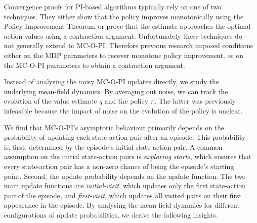 
Convergence proofs for PI-based algorithms 
typically rely on one of two techniques.
They either show that the policy improves monotonically using the Policy Improvement Theorem,
or prove that the estimate approaches the optimal action values using a contraction argument.
Unfortunately these techniques do not generally extend to MC-O-PI.
Therefore previous research imposed conditions either on
the MDP parameters to recover monotone policy improvement,
or
on the MC-O-PI parameters to obtain a contraction argument.


Instead of analysing the noisy MC-O-PI updates directly,
we study the underlying mean-field dynamics.
By averaging out noise, we can track the evolution of the value estimate $q$ and the policy $\pi$. The latter was previously infeasible because the impact of noise on the evolution of the policy is unclear.


We find that MC-O-PI's asymptotic behaviour primarily depends on the probability of updating each state-action pair after an episode.
This probability is, first, determined by the episode's initial state-action pair.
% 
A common assumption on the initial state-action pairs is \textit{exploring starts}, which ensures that every state-action pair has a non-zero chance of being the episode's starting point.
Second, the update probability depends on the update function.
The two main update functions are \textit{initial-visit}, which updates only the first state-action pair of the episode,
and \textit{first-visit}, which updates all visited pairs on their first appearance in the episode.
By analysing the mean-field dynamics for different configurations of update probabilities, we derive the following insights.





